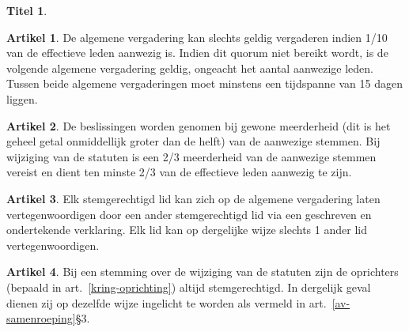 \documentclass[a4paper,10pt]{article}
\theoremstyle{definition}
\newtheorem{titel}{\newline\Large Titel}
\newtheorem{artikelbase}{\large Artikel}
\newenvironment{artikel}
  {\begin{artikelbase}}
  {\smallskip
   \end{artikelbase}}
\newcommand{\ttextcr}{\hfill\newline}
\begin{document}
\begin{titel}
  \begin{artikel}\ttextcr
    De algemene vergadering kan slechts geldig vergaderen indien 1/10 van de effectieve leden aanwezig is.
    Indien dit quorum niet bereikt wordt, is de volgende algemene vergadering geldig, ongeacht het aantal aanwezige leden.
    Tussen beide algemene vergaderingen moet minstens een tijdspanne van 15 dagen liggen.
  \end{artikel}

  \begin{artikel}\label{av-beslissen}\ttextcr
    De beslissingen worden genomen bij gewone meerderheid (dit is het geheel getal onmiddellijk groter dan de helft) van de aanwezige stemmen.
    Bij wijziging van de statuten is een 2/3 meerderheid van de aanwezige stemmen vereist en dient ten minste 2/3 van de effectieve leden aanwezig te zijn.
  \end{artikel}

  \begin{artikel}\ttextcr
    Elk stemgerechtigd lid kan zich op de algemene vergadering laten vertegenwoordigen door een ander stemgerechtigd lid via een geschreven en ondertekende verklaring.
    Elk lid kan op dergelijke wijze slechts 1 ander lid vertegenwoordigen.
  \end{artikel}

  \begin{artikel}\ttextcr
    Bij een stemming over de wijziging van de statuten zijn de oprichters (bepaald in art.~\ref{kring-oprichting}) altijd stemgerechtigd.
    In dergelijk geval dienen zij op dezelfde wijze ingelicht te worden als vermeld in art.~\ref{av-samenroeping}\S3.
  \end{artikel}


\end{titel}

\end{document}
